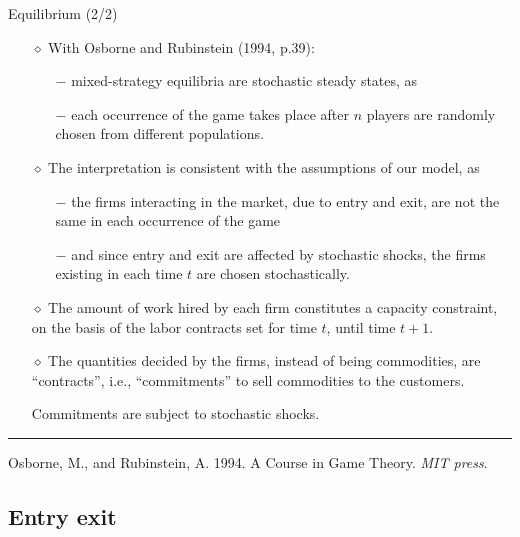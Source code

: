 \documentclass[9pt]{beamer}
\begin{document}
\begin{frame}{Equilibrium (2/2)}

\begin{itemize}

\item[$\diamond$] With Osborne and Rubinstein (1994, p.39):
\begin{itemize}
\item[$-$] mixed-strategy equilibria are stochastic steady states, as
\item[$-$] each occurrence of the game takes place after $n$ players are randomly chosen from different populations. 
\end{itemize}

\item[$\diamond$] The interpretation is consistent with the assumptions of our model, as 
\begin{itemize}
\item[$-$]  the firms interacting in the market, due to entry and exit, are
not the same in each occurrence of the game

\item[$-$]  and since entry and exit are affected by stochastic shocks, the firms existing in each time $t$ are
chosen stochastically.
\end{itemize}

\item[$\diamond$] The amount of work hired by each firm constitutes a capacity constraint, on the basis
of the labor contracts set for time $t$, until time $t+1$.

\item[$\diamond$] The quantities decided by
the firms, instead of being commodities, are ``contracts'', i.e., ``commitments''
to sell commodities to the customers. 

Commitments are subject to stochastic shocks. 

\end{itemize}

\bigskip
\scriptsize
\noindent\rule{8cm}{0.4pt}

Osborne, M., and Rubinstein, A. 1994. A Course in Game Theory. \emph{MIT press}.

\end{frame}

\subsection{Entry exit}
\end{document}
